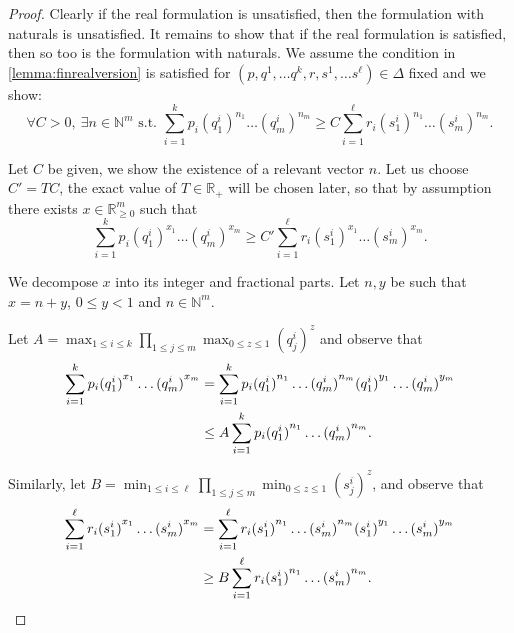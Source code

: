 \documentclass[10pt,a4paper]{amsart}
\numberwithin{equation}{section}
\theoremstyle{plain}
\theoremstyle{definition}
\theoremstyle{remark}
\begin{document}
\begin{proof}
Clearly if the real formulation is unsatisfied, then the formulation with naturals is unsatisfied. It remains to show that if the real formulation is satisfied, then so too is the formulation with naturals. We assume the condition in \cref{lemma:finrealversion} is satisfied for $({p},{q}^1,\dots {q}^{k}, {r},{s}^1,\dots {s}^{\ell}) \in \Delta$ fixed and we  show: \[\forall C > 0, \ \exists {n} \in \mathbb{N}^m \text{ s.t. } \sum_{i=1}^{k} p_i{({q}^i_1)}^{n_1}\dots {({q}^i_m)}^{n_m} \ge C\sum_{i=1}^{\ell} r_i{({s}^i_1)}^{n_1}\dots {({s}^i_m)}^{n_m}.\]

Let $C$ be given, we show the existence of a relevant vector ${n}$. Let us choose $C' = TC$, the exact value of $T\in\mathbb{R}_{+}$ will be chosen later, so that by assumption there exists ${x} \in \mathbb{R}_{\ge 0}^m$ such that  \begin{equation}\label{eq:mainin} \sum_{i=1}^{k} p_i{({q}^i_1)}^{x_1}\dots {({q}^i_m)}^{x_m} \ge C' \sum_{i=1}^{\ell} r_i{({s}^i_1)}^{x_1}\dots {({s}^i_m)}^{x_m}.\end{equation}

We decompose ${x}$ into its integer  and fractional parts. Let ${n},{y}$ be such that ${x} = {n} + {y}$, ${0}\le{y}< {1}$ and ${n} \in \mathbb{N}^m $.

Let $\displaystyle A = \max_{1\le i \le k}   \prod_{1\le j \le m} \max_{0\le z \le 1} {({q}^i_j)}^{z} $ and observe that
\begin{align} \notag \sum_{i=1}^{k} p_i{({q}^i_1)}^{x_1}\dots {({q}^i_m)}^{x_m} &= \sum_{i=1}^{k} p_i{({q}^i_1)}^{n_1}\dots {({q}^i_m)}^{n_m}{({q}^i_1)}^{y_1}\dots {({q}^i_m)}^{y_m}
\\
\label{eq:firstin}&\le A \sum_{i=1}^{k} p_i{({q}^i_1)}^{n_1}\dots {({q}^i_m)}^{n_m}.\end{align}

Similarly, let $\displaystyle B = \min_{1\le i \le \ell}   \prod_{1\le j \le m} \min_{0\le z \le 1} {({s}^i_j)}^{z} $, and observe that
\begin{align}
\sum_{i=1}^{\ell} r_i{({s}^i_1)}^{x_1}\dots {({s}^i_m)}^{x_m} &= \sum_{i=1}^{\ell} r_i{({s}^i_1)}^{n_1}\dots {({s}^i_m)}^{n_m}{({s}^i_1)}^{y_1}\dots {({s}^i_m)}^{y_m}\notag
\\
\label{eq:thirdin}&\ge B \sum_{i=1}^{\ell} r_i{({s}^i_1)}^{n_1}\dots {({s}^i_m)}^{n_m}.\end{align}


\end{proof}
\end{document}
